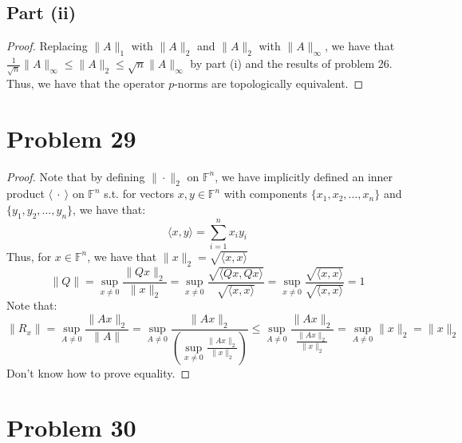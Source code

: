 \documentclass{article}
\begin{document}
\subsection*{Part (ii)}

\begin{proof}
Replacing $\|A\|_1$ with $ \|A\|_2$ and  $\|A\|_2$ with $ \|A\|_{\infty}$, we have that $\frac{1}{\sqrt{n}}\|A\|_{\infty} \leq \|A\|_2 \leq \sqrt{n}\|A\|_{\infty}$ by part (i) and the results of problem 26. Thus, we have that the operator $p$-norms are topologically equivalent.
\end{proof}


\section*{Problem 29}

\begin{proof}
Note that by defining $\| \cdot \|_2$ on $\mathbb{F}^n$, we have implicitly defined an inner product $\langle \ \cdot \ \rangle$ on $\mathbb{F}^n$ s.t. for vectors $x, y \in \mathbb{F}^n$ with components $\{x_1, x_2, \dots, x_n\}$ and $\{y_1, y_2, \dots, y_n\}$, we have that:
$$\langle x, y \rangle = \sum\limits_{i = 1}^n x_{i}y_{i}$$
Thus, for $x \in \mathbb{F}^n$, we have that $\|x\|_2 = \sqrt{\langle x, x \rangle}$ \\
$$\|Q\| = \sup_{x \ne 0} \frac{\|Qx\|_2}{\|x\|_2} = \sup_{x \ne 0} \frac{\sqrt{\langle Qx, Qx \rangle}}{\sqrt{\langle x, x \rangle}} =\sup_{x \ne 0} \frac{\sqrt{\langle x, x \rangle}}{\sqrt{\langle x, x \rangle}} = 1$$
Note that:
$$\|R_x\| = \sup_{A \ne 0} \frac{\|Ax\|_2}{\|A\|} =  \sup_{A \ne 0} \frac{\|Ax\|_2}{\left(\sup_{x \ne 0} \frac{\|Ax\|_2}{\|x\|_2}\right)} \leq \sup_{A \ne 0} \frac{\|Ax\|_2}{\frac{\|Ax\|_2}{\|x\|_2}} = \sup_{A \ne 0} \|x\|_2 = \|x\|_2$$
Don't know how to prove equality.
\end{proof}

\section*{Problem 30}
\end{document}
